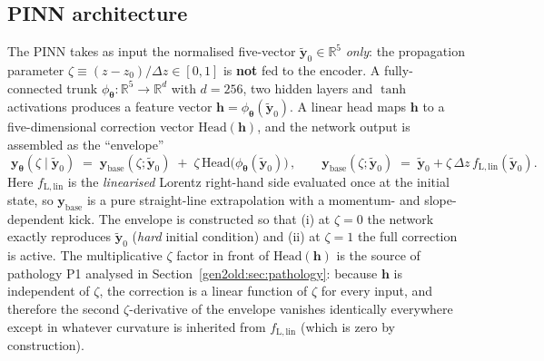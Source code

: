 \documentclass[a4paper,11pt]{article}
\newcommand{\dz}{\Delta z}
\newcommand{\state}{\mathbf{y}}
\newcommand{\btheta}{\bm{\theta}}
\begin{document}
\subsection{PINN architecture}\label{gen2old:sub:pinn_arch}

The PINN takes as input the normalised five-vector $\tilde{\state}_0\in\mathbb{R}^5$
\emph{only}: the propagation parameter
$\zeta \equiv (z-z_0)/\dz \in [0,1]$ is \textbf{not} fed to the encoder.
A fully-connected trunk $\phi_{\btheta}:\mathbb{R}^5\to\mathbb{R}^d$ with
$d\!=\!256$, two hidden layers and $\tanh$ activations produces a feature
vector $\mathbf{h}=\phi_{\btheta}(\tilde{\state}_0)$. A linear head maps
$\mathbf{h}$ to a five-dimensional correction vector
$\mathrm{Head}(\mathbf{h})$, and the network output is assembled as the
``envelope''
\begin{equation}\label{gen2old:eq:envelope}
  \boxed{\;
    \state_{\btheta}(\zeta\mid\tilde{\state}_0)
    \;=\;
    \state_{\mathrm{base}}(\zeta;\tilde{\state}_0)
    \;+\;
    \zeta\,\mathrm{Head}\!\bigl(\phi_{\btheta}(\tilde{\state}_0)\bigr)\,,\qquad
    \state_{\mathrm{base}}(\zeta;\tilde{\state}_0)
    \;=\;
    \tilde{\state}_0 + \zeta\,\dz\,f_{\mathrm{L,lin}}(\tilde{\state}_0).
  \;}
\end{equation}
Here $f_{\mathrm{L,lin}}$ is the \emph{linearised} Lorentz right-hand side
evaluated once at the initial state, so $\state_{\mathrm{base}}$ is a pure
straight-line extrapolation with a momentum- and slope-dependent kick. The
envelope is constructed so that (i) at $\zeta=0$ the network exactly reproduces
$\tilde{\state}_0$ (\emph{hard} initial condition) and (ii) at
$\zeta=1$ the full correction is active. The multiplicative $\zeta$ factor in
front of $\mathrm{Head}(\mathbf{h})$ is the source of pathology P1 analysed
in Section~\ref{gen2old:sec:pathology}: because $\mathbf{h}$ is independent
of $\zeta$, the correction is a linear function of $\zeta$ for every input, and
therefore the second $\zeta$-derivative of the envelope vanishes identically
everywhere except in whatever curvature is inherited from $f_{\mathrm{L,lin}}$
(which is zero by construction).
\end{document}
